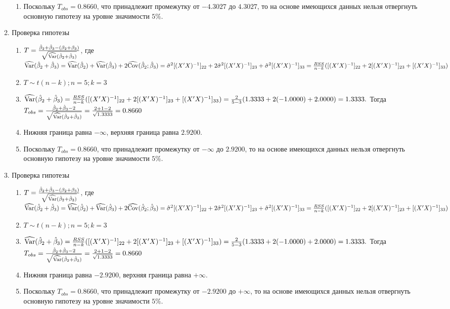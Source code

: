 \begin{problem}
\begin{sol}
\begin{enumerate}
\begin{enumerate}
\item Поскольку $T_{obs} = 0.8660$, что принадлежит промежутку от $-4.3027$ до $4.3027$, 
то на основе имеющихся данных нельзя отвергнуть основную гипотезу на уровне значимости $5\%$.
\end{enumerate}
\item Проверка гипотезы
\begin{enumerate}
\item $T = \frac{\hat{\beta}_2 + \hat{\beta}_3 - (\beta_2 + \beta_3)}{\sqrt{\widehat{\operatorname{Var}}(\hat{\beta}_2 + \hat{\beta}_3)}}$, где $\widehat{\operatorname{Var}}(\hat{\beta}_2 + \hat{\beta}_3) = \widehat{\operatorname{Var}}(\hat{\beta}_2) + \widehat{\operatorname{Var}}(\hat{\beta}_3) + 2\widehat{\operatorname{Cov}}(\hat{\beta}_2;\hat{\beta}_3) = \hat{\sigma}^2 [(X'X)^{-1}]_{22} + 2\hat{\sigma}^2 [(X'X)^{-1}]_{23} + \hat{\sigma}^2 [(X'X)^{-1}]_{33}= \frac{RSS}{n - k}([(X'X)^{-1}]_{22} + 2[(X'X)^{-1}]_{23} + [(X'X)^{-1}]_{33})$
\item $T \sim t(n-k); n = 5; k = 3$
\item $\widehat{\operatorname{Var}}(\hat{\beta}_2 + \hat{\beta}_3) = \frac{RSS}{n - k}([(X'X)^{-1}]_{22} + 2[(X'X)^{-1}]_{23} + [(X'X)^{-1}]_{33}) = \frac{2}{5 - 3} (1.3333 + 2(-1.0000) + 2.0000) = 1.3333.$ Тогда $T_{obs} = \frac{\hat{\beta}_2 + \hat{\beta}_3 - 2}{\sqrt{\widehat{\operatorname{Var}}(\hat{\beta}_2 + \hat{\beta}_3)}} = \frac{2 + 1 - 2}{\sqrt{1.3333}} = 0.8660$
\item Нижняя граница равна $- \infty$, верхняя граница равна $2.9200$.
\item Поскольку $T_{obs} = 0.8660$, что принадлежит промежутку от $- \infty$ до $2.9200$, 
то на основе имеющихся данных нельзя отвергнуть основную гипотезу на уровне значимости $5\%$.
\end{enumerate}
\item Проверка гипотезы
\begin{enumerate}
\item $T = \frac{\hat{\beta}_2 + \hat{\beta}_3 - (\beta_2 + \beta_3)}{\sqrt{\widehat{\operatorname{Var}}(\hat{\beta}_2 + \hat{\beta}_3)}}$, где $\widehat{\operatorname{Var}}(\hat{\beta}_2 + \hat{\beta}_3) = \widehat{\operatorname{Var}}(\hat{\beta}_2) + \widehat{\operatorname{Var}}(\hat{\beta}_3) + 2\widehat{\operatorname{Cov}}(\hat{\beta}_2;\hat{\beta}_3) = \hat{\sigma}^2 [(X'X)^{-1}]_{22} + 2\hat{\sigma}^2 [(X'X)^{-1}]_{23} + \hat{\sigma}^2 [(X'X)^{-1}]_{33}= \frac{RSS}{n - k}([(X'X)^{-1}]_{22} + 2[(X'X)^{-1}]_{23} + [(X'X)^{-1}]_{33})$
\item $T \sim t(n-k); n = 5; k = 3$
\item $\widehat{\operatorname{Var}}(\hat{\beta}_2 + \hat{\beta}_3) = \frac{RSS}{n - k}([(X'X)^{-1}]_{22} + 2[(X'X)^{-1}]_{23} + [(X'X)^{-1}]_{33}) = \frac{2}{5 - 3} (1.3333 + 2(-1.0000) + 2.0000) = 1.3333.$ Тогда $T_{obs} = \frac{\hat{\beta}_2 + \hat{\beta}_3 - 2}{\sqrt{\widehat{\operatorname{Var}}(\hat{\beta}_2 + \hat{\beta}_3)}} = \frac{2 + 1 - 2}{\sqrt{1.3333}} = 0.8660$
\item Нижняя граница равна $- 2.9200$, верхняя граница равна $+ \infty$.
\item Поскольку $T_{obs} = 0.8660$, что принадлежит промежутку от $-  2.9200$ до $+ \infty$, 
то на основе имеющихся данных нельзя отвергнуть основную гипотезу на уровне значимости $5\%$.
\end{enumerate}
\end{enumerate}
\end{sol}
\end{problem}




